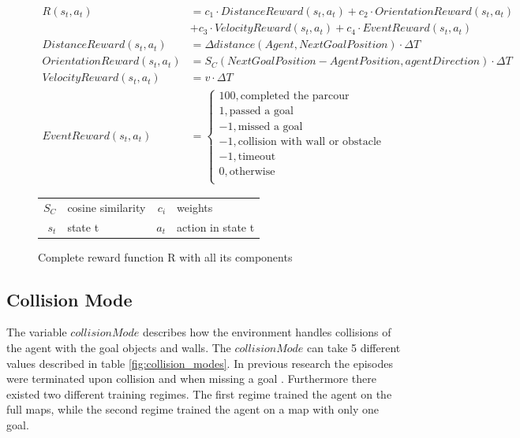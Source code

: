 \begin{figure}
    \centering
    \begin{align}
         R(s_t,a_t) &= c_1 \cdot DistanceReward(s_t,a_t) + c_2 \cdot OrientationReward(s_t,a_t) \nonumber \\
         &  + c_3 \cdot VelocityReward(s_t, a_t) + c_4 \cdot EventReward(s_t, a_t) \nonumber \\
         DistanceReward(s_t,a_t) &= \Delta distance(Agent, NextGoalPosition) \cdot \Delta T \nonumber \\
         OrientationReward(s_t,a_t) &= S_C(NextGoalPosition - AgentPosition, agentDirection) \cdot \Delta T \nonumber \\
         VelocityReward(s_t, a_t) &= v \cdot \Delta T \nonumber \\
         EventReward(s_t, a_t) &= \begin{cases}
              100,           \text{completed the parcour}           \\
              1,             \text{passed a goal}                   \\
              -1,            \text{missed a goal}                   \\
              -1,            \text{collision with wall or obstacle} \\
              -1,            \text{timeout}                         \\
              0,             \text{otherwise}                       \\
         \end{cases} \nonumber
    \end{align}
    \caption{Complete reward function R with all its components}
    \begin{tabular}{r@{: }l r@{: }l}
    $S_C$ & cosine similarity & $c_i$ & weights\\
    $s_t$& state t & $a_t$& action in state t 
    \end{tabular}
    \label{fig:reward_functions}
\end{figure}



\subsection{Collision Mode}

The variable $collisionMode$ describes how the environment handles collisions of the agent with the goal objects and walls. The $collisionMode$ can take 5 different values described in table \ref{fig:collision_modes}. In previous research the episodes were terminated upon collision and when missing a goal \autocite{maximilian}. Furthermore there existed two different training regimes. The first regime trained the agent on the full maps, while the second regime trained the agent on a map with only one goal.

